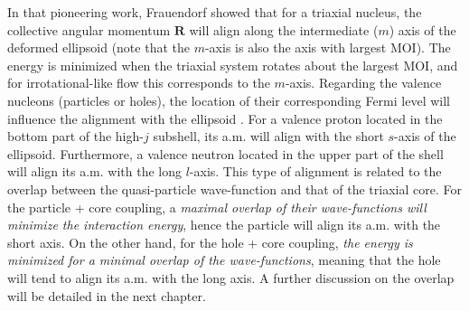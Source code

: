 In that pioneering work, Frauendorf showed that for a triaxial nucleus, the collective angular momentum $\mathbf{R}$ will align along the intermediate ($m$) axis of the deformed ellipsoid (note that the $m$-axis is also the axis with largest MOI). The energy is minimized when the triaxial system rotates about the largest MOI, and for irrotational-like flow this corresponds to the $m$-axis. Regarding the valence nucleons (particles or holes), the location of their corresponding Fermi level will influence the alignment with the ellipsoid \cite{frauendorf1997tilted,starosta2001chiral}. For a valence proton located in the bottom part of the high-$j$ subshell, its a.m. will align with the short $s$-axis of the ellipsoid. Furthermore, a valence neutron located in the upper part of the shell will align its a.m. with the long $l$-axis. This type of alignment is related to the overlap between the quasi-particle wave-function and that of the triaxial core. For the particle + core coupling, a \emph{maximal overlap of their wave-functions will minimize the interaction energy}, hence the particle will align its a.m. with the short axis. On the other hand, for the hole + core coupling, \emph{the energy is minimized for a minimal overlap of the wave-functions}, meaning that the hole will tend to align its a.m. with the long axis. A further discussion on the overlap will be detailed in the next chapter.

